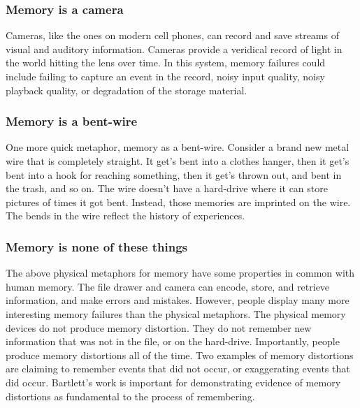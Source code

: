 \documentclass[
  oneside,
  12pt]{crumpbook}
\begin{document}
\hypertarget{memory-is-a-camera}{%
\subsubsection{Memory is a camera}\label{memory-is-a-camera}}

Cameras, like the ones on modern cell phones, can record and save streams of visual and auditory information. Cameras provide a veridical record of light in the world hitting the lens over time. In this system, memory failures could include failing to capture an event in the record, noisy input quality, noisy playback quality, or degradation of the storage material.

\hypertarget{memory-is-a-bent-wire}{%
\subsubsection{Memory is a bent-wire}\label{memory-is-a-bent-wire}}

One more quick metaphor, memory as a bent-wire. Consider a brand new metal wire that is completely straight. It get's bent into a clothes hanger, then it get's bent into a hook for reaching something, then it get's thrown out, and bent in the trash, and so on. The wire doesn't have a hard-drive where it can store pictures of times it got bent. Instead, those memories are imprinted on the wire. The bends in the wire reflect the history of experiences.

\hypertarget{memory-is-none-of-these-things}{%
\subsubsection{Memory is none of these things}\label{memory-is-none-of-these-things}}

The above physical metaphors for memory have some properties in common with human memory. The file drawer and camera can encode, store, and retrieve information, and make errors and mistakes. However, people display many more interesting memory failures than the physical metaphors. The physical memory devices do not produce memory distortion. They do not remember new information that was not in the file, or on the hard-drive. Importantly, people produce memory distortions all of the time. Two examples of memory distortions are claiming to remember events that did not occur, or exaggerating events that did occur. Bartlett's work is important for demonstrating evidence of memory distortions as fundamental to the process of remembering.
\end{document}
